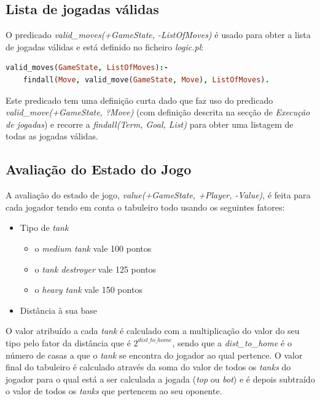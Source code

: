 \documentclass[a4paper,11pt,portuguese]{article}
\begin{document}
    \subsection{Lista de jogadas válidas}

    O predicado \textit{valid\_moves(+GameState, -ListOfMoves)} é usado para obter a
    lista de jogadas válidas e está definido no ficheiro \textit{logic.pl}:

\begin{lstlisting}[language=prolog]
% valid_moves(+GameState, -ListOfMoves)
valid_moves(GameState, ListOfMoves):-
    findall(Move, valid_move(GameState, Move), ListOfMoves).
\end{lstlisting}

    \noindent Este predicado tem uma definição curta dado que faz uso do predicado
    \textit{valid\_move(+GameState, ?Move) } (com definição descrita na secção de
    \textit{Execução de jogadas}) e recorre a \textit{findall(Term, Goal, List)}
    para obter uma listagem de todas as jogadas válidas.


    \subsection{Avaliação do Estado do Jogo}

    A avaliação do estado de jogo, \textit{value(+GameState, +Player, -Value)}, é feita
    para cada jogador tendo em conta o tabuleiro todo usando os seguintes fatores:
    \begin{itemize}
        \item Tipo de \textit{tank}
        \begin{itemize}
            \item o \textit{medium tank} vale 100 pontos
            \item o \textit{tank destroyer} vale 125 pontos
            \item o \textit{heavy tank} vale 150 pontos
        \end{itemize}
        \item Distância à sua base
    \end{itemize}

    O valor atribuído a cada \textit{tank} é calculado com a multiplicação do valor do seu tipo
    pelo fator da distância que é $ 2^{dist\_to\_home} $, sendo que a \textit{dist\_to\_home}
    é o número de casas a que o \textit{tank} se encontra do jogador ao qual pertence.
    O valor final do tabuleiro é calculado através da soma do valor de todos os \textit{tanks}
    do jogador para o qual está a ser calculada a jogada (\textit{top} ou \textit{bot}) e é
    depois subtraído o valor de todos os \textit{tanks} que pertencem ao seu oponente.
\end{document}
